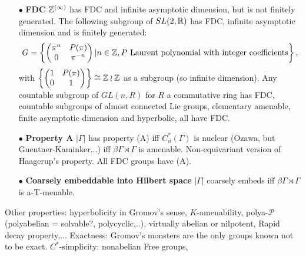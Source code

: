 \begin{itemize}
\item[$\bullet$] \textbf{FDC} $\mathbb Z^{(\infty)}$ has FDC and infinite asymptotic dimension, but is not finitely generated. The following subgroup of $SL(2,\mathbb R)$ has FDC, infinite asymptotic dimension and is finitely generated:  
\[G= \left\{\begin{pmatrix} \pi^n  & P(\pi) \\ 0 & \pi^{-n}\end{pmatrix} | n\in \mathbb Z, P \text{ Laurent polynomial with integer coefficients}\right\},\]
with $\left\{\begin{pmatrix} 1  & P(\pi) \\ 0 & 1\end{pmatrix} \right\} \cong \mathbb Z \wr \mathbb Z $ as a subgroup (so infinite dimension). Any countable subgroup of $GL(n,R)$ for $R$ a commutative ring has FDC, countable subgroups of almost connected Lie groups, elementary amenable, finite asymptotic dimension and hyperbolic, all have FDC.
\\

\item[$\bullet$] \textbf{Property A} $|\Gamma|$ has property (A) iff $C_u^*(\Gamma)$ is nuclear (Ozawa, but Guentner-Kaminker...) iff $\beta \Gamma \rtimes \Gamma$ is amenable. Non-equivariant version of Haagerup's property. All FDC groups have (A).\\
\item[$\bullet$] \textbf{Coarsely embeddable into Hilbert space} $|\Gamma|$ coarsely embeds iff $\beta \Gamma \rtimes \Gamma$ is a-T-menable.\\
\end{itemize}

Other properties: hyperbolicity in Gromov's sense, $K$-amenability, polya-$\mathcal P$ (polyabelian = solvable?, polycyclic,..), virtually abelian or nilpotent, Rapid decay property,... Exactness: Gromov's monsters are the only groups known not to be exact. $C^*$-simplicity: nonabelian Free groups, \\

\newpage

